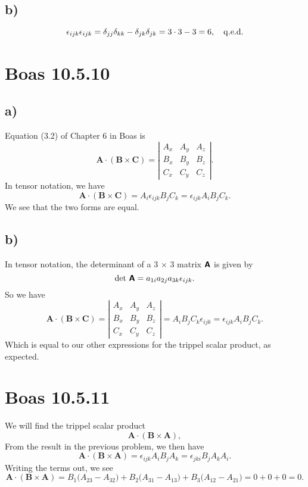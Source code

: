 \documentclass[a4paper, 11pt, titlepage, english]{article}
\newcommand{\eps}{\epsilon}
\newcommand{\bt}[1]{\boldsymbol{#1}}
\newcommand{\mat}[1]{\textsf{\textbf{#1}}}
\begin{document}
\subsection*{b)}
$$\eps_{ijk}\eps_{ijk} = \delta_{jj}\delta_{kk} - \delta_{jk}\delta_{jk} = 3\cdot 3 - 3 = 6, \quad {\rm q.e.d.}$$

\section*{Boas 10.5.10}
\subsection*{a)}
Equation (3.2) of Chapter 6 in Boas is
$$\bt{A} \cdot (\bt{B}\times \bt{C}) = \left| \begin{matrix}
                                               A_x & A_y & A_z \\
                                               B_x & B_y & B_z \\
                                               C_x & C_y & C_z
                                              \end{matrix}\right|.
$$
In tensor notation, we have
$$\bt{A} \cdot (\bt{B}\times \bt{C}) = A_i \epsilon_{ijk} B_j C_k = \epsilon_{ijk}A_iB_jC_k. $$
We see that the two forms are equal.

\subsection*{b)}
In tensor notation, the determinant of a 3 $\times$ 3 matrix $\mat{A}$ is given by
$${\rm det}\ \mat{A} = a_{1i}a_{2j}a_{3k}\eps_{ijk}.$$
So we have
$$\bt{A} \cdot (\bt{B}\times \bt{C}) = \left| \begin{matrix}
                                               A_x & A_y & A_z \\
                                               B_x & B_y & B_z \\
                                               C_x & C_y & C_z
                                              \end{matrix}\right| = A_iB_jC_k\eps_{ijk} = \eps_{ijk}A_iB_jC_k.
                                            $$
Which is equal to our other expressions for the trippel scalar product, as expected.


\section*{Boas 10.5.11}
We will find the trippel scalar product
$$\bt{A}\cdot(\bt{B}\times\bt{A}),$$
From the result in the previous problem, we then have
$$\bt{A}\cdot(\bt{B}\times\bt{A}) = \eps_{ijk}A_iB_jA_k = \epsilon_{jki}B_jA_kA_i.$$
Writing the terms out, we see
$$\bt{A}\cdot(\bt{B}\times\bt{A})  = B_1\big(A_23 - A_32\big) + B_2\big(A_31 - A_13\big) + B_3\big(A_12 - A_21\big) = 0 + 0 + 0 = 0.$$
\end{document}
